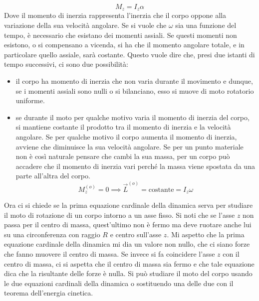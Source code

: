 \documentclass[10pt,a4paper]{book}
\begin{document}
\[
	M_z = I_z \alpha
\]
Dove il momento di inerzia rappresenta l'inerzia che il corpo oppone alla variazione della sua velocità angolare. Se si vuole che $\omega$ sia una funzione del tempo, è necessario che esistano dei momenti assiali. Se questi momenti non esistono, o si compensano a vicenda, si ha che il momento angolare totale, e in particolare quello assiale, sarà costante. Questo vuole dire che, presi due istanti di tempo successivi, ci sono due possibilità:
\begin{itemize}
	\item il corpo ha momento di inerzia che non varia durante il movimento e dunque, se i momenti assiali sono nulli o si bilanciano, esso si muove di moto rotatorio uniforme.
	\item se durante il moto per qualche motivo varia il momento di inerzia del corpo, si mantiene costante il prodotto tra il momento di inerzia e la velocità angolare. Se per qualche motivo il corpo aumenta il momento di inerzia, avviene che diminuisce la sua velocità angolare. Se per un punto materiale non è così naturale pensare che cambi la sua massa, per un corpo può accadere che il momento di inerzia vari perché la massa viene spostata da una parte all'altra del corpo.
	\[
		M_z^{(o)} = 0 \implies \vec{L}^{(o)} = \text{costante} = I_z\omega
	\]
\end{itemize}
Ora ci si chiede se la prima equazione cardinale della dinamica serva per studiare il moto di rotazione di un corpo intorno a un asse fisso. Si noti che se l'asse $z$ non passa per il centro di massa, quest'ultimo non è fermo ma deve ruotare anche lui su una circonferenza con raggio $R$ e centro sull'asse $z$. Mi aspetto che la prima equazione cardinale della dinamica mi dia un valore non nullo, che ci siano forze che fanno muovere il centro di massa. Se invece si fa coincidere l'asse $z$ con il centro di massa, ci si aspetta che il centro di massa sia fermo e che tale equazione dica che la risultante delle forze è nulla. Si può studiare il moto del corpo usando le due equazioni cardinali della dinamica o sostituendo una delle due con il teorema dell'energia cinetica.
\end{document}
